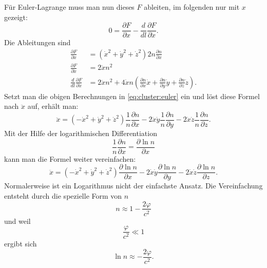 \begin{refsection}
Für Euler-Lagrange muss man nun dieses \(F\) ableiten, im folgenden
nur mit \(x\) gezeigt:
\begin{equation}
  \label{eq:cluster:euler}
  0 = \frac{\partial F}{\partial x} - \frac{d}{d l} \frac{\partial
    F}{\partial \dot{x}}.
\end{equation}
Die Ableitungen sind
\begin{align*}
  \frac{\partial F}{\partial x} &= (\dot{x}^2+\dot{y}^2+\dot{z}^2) 2n
                                  \frac{\partial n}{\partial x}\\
  \frac{\partial F}{\partial\dot{x}} &= 2\dot{x}n^2\\
  \frac{d}{d l}\frac{\partial F}{\partial\dot{x}} &= 2\ddot{x}n^2 + 4\dot{x}n
                                \left(\frac{\partial n}{\partial x}\dot{x} +
                                \frac{\partial n}{\partial y}\dot{y} +
                                \frac{\partial n}{\partial z}\dot{z} \right).
\end{align*}
Setzt man die obigen Berechnungen in \ref{eq:cluster:euler} ein und
löst diese Formel nach \(\ddot{x}\) auf, erhält man:
\begin{equation}
  \ddot{x} = (-\dot{x}^2+\dot{y}^2+\dot{z}^2)
  \frac{1}{n}\frac{\partial n}{\partial x} -
  2\dot{x}\dot{y} \frac{1}{n}\frac{\partial n}{\partial y} -
  2\dot{x}\dot{z} \frac{1}{n}\frac{\partial n}{\partial z}.
\end{equation}
Mit der Hilfe der logarithmischen Differentiation
\begin{equation*}
  \frac{1}{n} \frac{\partial n}{\partial x} = \frac{\partial \ln
    n}{\partial x}
\end{equation*}
kann man die Formel weiter vereinfachen:
\begin{equation}
  \ddot{x} = (-\dot{x}^2+\dot{y}^2+\dot{z}^2) \frac{\partial \ln
    n}{\partial x} - 2\dot{x}\dot{y} \frac{\partial \ln n}{\partial y}
  - 2\dot{x}\dot{z} \frac{\partial \ln n}{\partial z}.
\end{equation}
Normalerweise ist ein Logarithmus nicht der einfachste Ansatz.  Die
Vereinfachung entsteht durch die spezielle Form von \(n\)
\begin{equation*}
  n \approx 1-\frac{2\varphi}{c^2}
\end{equation*}
und weil
\begin{equation*}
  \frac{\varphi}{c^2} \ll 1
\end{equation*}
ergibt sich
\begin{equation*}
  \ln n \approx -\frac{2\varphi}{c^2}.
\end{equation*}


\end{refsection}
